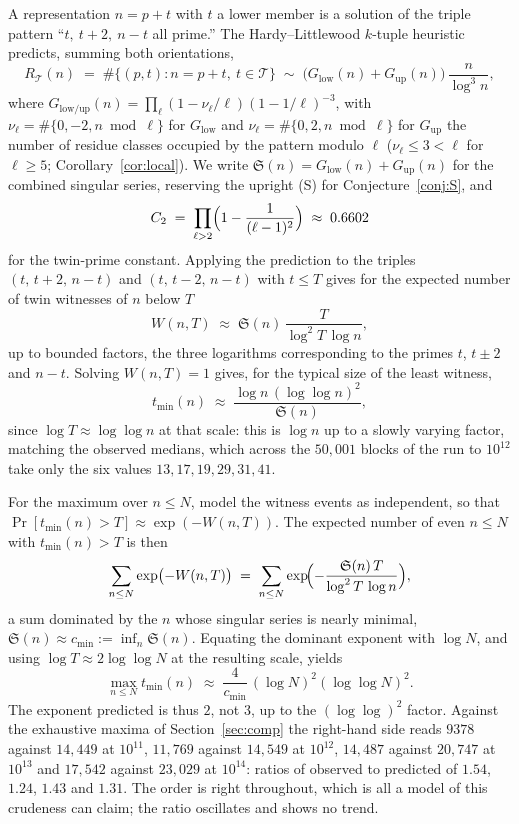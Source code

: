 \documentclass[10pt]{article}
\theoremstyle{definition}
\theoremstyle{remark}
\newcommand{\T}{\mathcal{T}}
\begin{document}
A representation $n = p + t$ with $t$ a lower member is a solution of the
triple pattern ``$t,\ t+2,\ n-t$ all prime.'' The Hardy--Littlewood
$k$-tuple heuristic \cite{HL} predicts, summing both orientations,
\[
R_\T(n) \;=\; \#\{(p,t): n = p + t,\ t \in \T\}
\;\sim\; \bigl(G_{\mathrm{low}}(n) + G_{\mathrm{up}}(n)\bigr)\,
\frac{n}{\log^3 n},
\]
where $G_{\mathrm{low/up}}(n) = \prod_{\ell}
(1 - \nu_\ell/\ell)(1 - 1/\ell)^{-3}$, with
$\nu_\ell = \#\{0, -2, n \bmod \ell\}$ for $G_{\mathrm{low}}$ and
$\nu_\ell = \#\{0, 2, n \bmod \ell\}$ for $G_{\mathrm{up}}$ the number of
residue classes occupied by the pattern modulo $\ell$
($\nu_\ell \le 3 < \ell$ for $\ell \ge 5$; Corollary~\ref{cor:local}). We
write $\mathfrak{S}(n) = G_{\mathrm{low}}(n) + G_{\mathrm{up}}(n)$ for the
combined singular series, reserving the upright (S) for
Conjecture~\ref{conj:S}, and
\[
C_2 \;=\; \prod_{\ell > 2}\Bigl(1 - \frac{1}{(\ell-1)^2}\Bigr)
\;\approx\; 0.6602
\]
for the twin-prime constant. Applying the prediction to the triples
$(t,\, t+2,\, n-t)$ and $(t,\, t-2,\, n-t)$ with $t \le T$ gives for the
expected number of twin witnesses of $n$ below $T$
\[
W(n, T) \;\approx\; \mathfrak{S}(n)\,\frac{T}{\log^2 T\,\log n},
\]
up to bounded factors, the three logarithms corresponding to the primes $t$,
$t \pm 2$ and $n - t$. Solving $W(n,T) = 1$ gives, for the typical size of the
least witness,
\[
t_{\min}(n) \;\approx\; \frac{\log n\,(\log\log n)^2}{\mathfrak{S}(n)},
\]
since $\log T \approx \log\log n$ at that scale: this is $\log n$ up to a
slowly varying factor, matching the observed medians, which across the
$50{,}001$ blocks of the run to $10^{12}$ take only the six values
$13, 17, 19, 29, 31, 41$.

For the maximum over $n \le N$, model the witness events as independent,
so that $\Pr[t_{\min}(n) > T] \approx \exp(-W(n,T))$. The expected number
of even $n \le N$ with $t_{\min}(n) > T$ is then
\[
\sum_{n \le N} \exp\bigl(-W(n,T)\bigr)
\;=\; \sum_{n \le N}
\exp\!\Bigl(-\frac{\mathfrak{S}(n)\,T}{\log^2 T\,\log n}\Bigr),
\]
a sum dominated by the $n$ whose singular series is nearly minimal,
$\mathfrak{S}(n) \approx c_{\min} := \inf_n \mathfrak{S}(n)$. Equating the
dominant exponent with $\log N$, and using $\log T \approx 2\log\log N$ at
the resulting scale, yields
\[
\max_{n \le N} t_{\min}(n) \;\approx\;
\frac{4}{c_{\min}}\,(\log N)^2 (\log\log N)^2 .
\]
The exponent predicted is thus $2$, not $3$, up to the $(\log\log)^2$
factor. Against the exhaustive maxima of Section~\ref{sec:comp} the
right-hand side reads $9378$ against $14{,}449$ at $10^{11}$, $11{,}769$
against $14{,}549$ at $10^{12}$, $14{,}487$ against $20{,}747$ at $10^{13}$
and $17{,}542$ against $23{,}029$ at $10^{14}$: ratios of observed to
predicted of $1.54$, $1.24$, $1.43$ and $1.31$. The order is right throughout,
which is all a model of this crudeness can claim; the ratio oscillates and
shows no trend.
\end{document}
